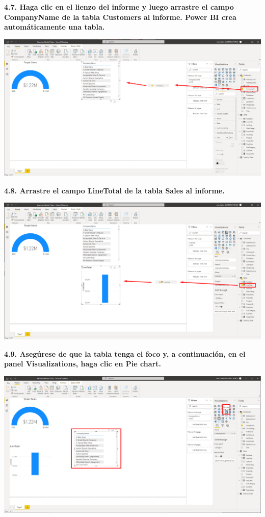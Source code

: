 \documentclass{article}
\begin{document}
\newpage
\textbf{4.7. Haga clic en el lienzo del informe y luego arrastre el campo \textbf{CompanyName} de la tabla \textbf{Customers} al informe. Power BI crea automáticamente una tabla.}

    \begin{center}
		\includegraphics[width=14cm]{./images/83} 
	\end{center}


\textbf{4.8. Arrastre el campo \textbf{LineTotal} de la tabla \textbf{Sales} al informe.}

    \begin{center}
		\includegraphics[width=14cm]{./images/84} 
	\end{center}


\textbf{4.9. Asegúrese de que la tabla tenga el foco y, a continuación, en el panel \textbf{Visualizations}, haga clic en \textbf{Pie chart}.}

    \begin{center}
		\includegraphics[width=14cm]{./images/85} 
	\end{center}
\end{document}
